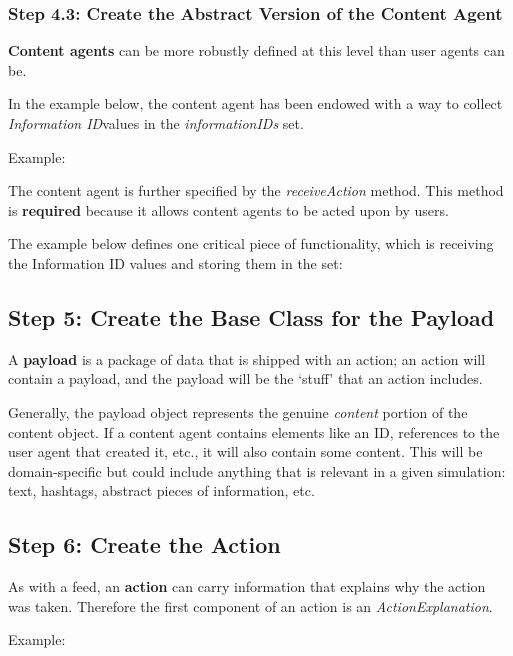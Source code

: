 \subsubsection{Step 4.3: Create the Abstract Version of the Content Agent}
\textbf{Content agents} can be more robustly defined at this level than user agents can be.

In the example below, the content agent has been endowed with a way to collect \textit{Information ID}values in the \textit{informationIDs} set.

Example:


The content agent is further specified by the \textit{receiveAction} method. This method is \textbf{required} because it allows content agents to be acted upon by users. 

The example below defines one critical piece of functionality, which is receiving the Information ID values and storing them in the set:



\subsection{Step 5: Create the Base Class for the Payload}
A \textbf{payload} is a package of data that is shipped with an action; an action will contain a payload, and the payload will be the `stuff' that an action includes.%

Generally, the payload object represents the genuine \textit{content} portion of the content object. If a content agent contains elements like an ID, references to the user agent that created it, etc., it will also contain some content. This will be domain-specific but could include anything that is relevant in a given simulation: text, hashtags, abstract pieces of information, etc.


\subsection{Step 6: Create the Action}
As with a feed, an \textbf{action} can carry information that explains why the action was taken. Therefore the first component of an action is an \textit{ActionExplanation}.

Example:


